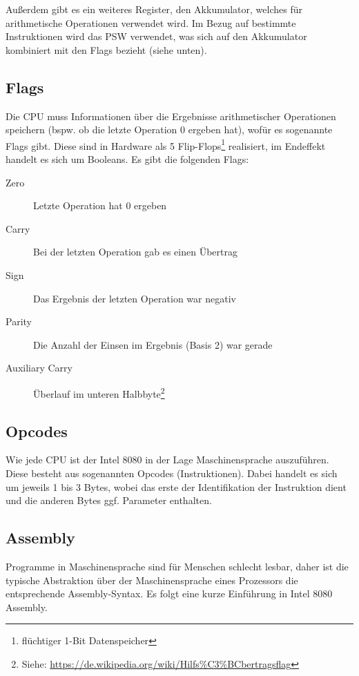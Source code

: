 Außerdem gibt es ein weiteres Register, den Akkumulator, welches für arithmetische Operationen verwendet wird. Im Bezug auf bestimmte Instruktionen wird das \ac{PSW} verwendet, was sich auf den Akkumulator kombiniert mit den Flags bezieht (siehe unten).

\subsection{Flags}\label{sec:flags}

Die CPU muss Informationen über die Ergebnisse arithmetischer Operationen speichern (bspw. ob die letzte Operation 0 ergeben hat), wofür es sogenannte Flags gibt. Diese sind in Hardware als 5 Flip-Flops\footnote{flüchtiger 1-Bit Datenspeicher} realisiert, im Endeffekt handelt es sich um Booleans. Es gibt die folgenden Flags:

\begin{description}
    \item[Zero] Letzte Operation hat 0 ergeben
    \item[Carry] Bei der letzten Operation gab es einen Übertrag
    \item[Sign] Das Ergebnis der letzten Operation war negativ
    \item[Parity] Die Anzahl der Einsen im Ergebnis (Basis 2) war gerade
    \item[Auxiliary Carry] Überlauf im unteren Halbbyte\footnote{Siehe: \url{https://de.wikipedia.org/wiki/Hilfs\%C3\%BCbertragsflag}}
\end{description}

\subsection{Opcodes}\label{sec:opcodes}

Wie jede \ac{CPU} ist der Intel 8080 in der Lage Maschinensprache auszuführen. Diese besteht aus sogenannten Opcodes (Instruktionen). Dabei handelt es sich um jeweils 1 bis 3 Bytes, wobei das erste der Identifikation der Instruktion dient und die anderen Bytes ggf. Parameter enthalten.

\subsection{Assembly}

Programme in Maschinensprache sind für Menschen schlecht lesbar, daher ist die typische Abstraktion über der Maschinensprache eines Prozessors die entsprechende Assembly-Syntax.
Es folgt eine kurze Einführung in Intel 8080 Assembly.

